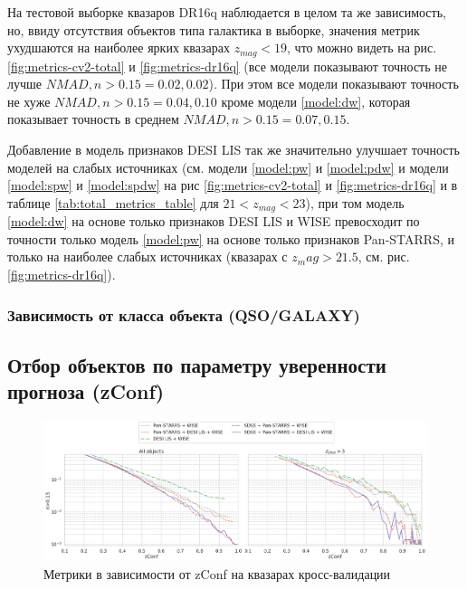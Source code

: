 \documentclass[fleqn,usenatbib]{mnras}
\begin{document}
На тестовой выборке квазаров DR16q наблюдается в целом та же зависимость, но, ввиду отсутствия объектов типа галактика в выборке, значения метрик ухудшаются на наиболее ярких квазарах $z_{mag} < 19$, что можно видеть на рис. \ref{fig:metrics-cv2-total} и \ref{fig:metrics-dr16q} (все модели показывают точность не лучше $NMAD, n>0.15 = 0.02, 0.02$). При этом все модели показывают точность не хуже $NMAD, n>0.15 = 0.04, 0.10$ кроме модели \ref{model:dw}, которая показывает точность в среднем $NMAD, n>0.15 = 0.07, 0.15$.

Добавление в модель признаков DESI LIS так же значительно улучшает точность моделей на слабых источниках (см. модели \ref{model:pw} и \ref{model:pdw} и модели \ref{model:spw} и \ref{model:spdw} на рис \ref{fig:metrics-cv2-total} и \ref{fig:metrics-dr16q} и в таблице \ref{tab:total_metrics_table} для $21 < z_{mag} < 23$), при том модель \ref{model:dw} на основе только признаков DESI LIS и WISE превосходит по точности только модель \ref{model:pw} на основе только признаков Pan-STARRS, и только на наиболее слабых источниках (квазарах с $z_mag > 21.5$, см. рис. \ref{fig:metrics-dr16q}).

\clearpage
\subsubsection{Зависимость от класса объекта (QSO/GALAXY)}


\subsection{Отбор объектов по параметру уверенности прогноза (zConf)}

\begin{figure}
    \centering
    \includegraphics[width=0.99\linewidth]{images/metrics-by-zconf-cv2-qso.png}
    \caption{Метрики в зависимости от zConf на квазарах кросс-валидации}
    \label{fig:metrics-zconf-cv2}
\end{figure}
\end{document}
